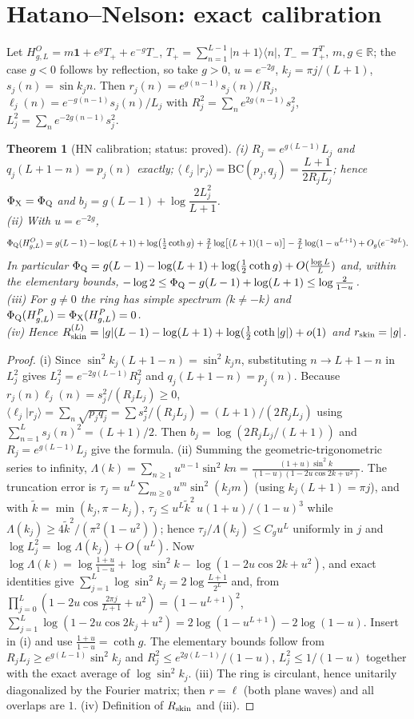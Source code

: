 \documentclass[11pt]{article}
\newtheorem{theorem}{Theorem}
\newcommand{\id}{\mathbf{1}}
\newcommand{\Rskin}{R_{\rm skin}}
\newcommand{\rskin}{r_{\rm skin}}
\newcommand{\PhiQ}{\Phi_{\rm Q}}
\newcommand{\PhiX}{\Phi_{\rm X}}
\newcommand{\BC}{\mathrm{BC}}
\newcommand{\ip}[2]{\langle #1|#2\rangle}
\begin{document}
\section{Hatano--Nelson: exact calibration}
Let $H^O_{g,L}=m\id+e^{g}T_++e^{-g}T_-$, $T_+=\sum_{n=1}^{L-1}|n{+}1\rangle\langle n|$, $T_-=T_+^T$, $m,g\in\mathbb R$; the case $g<0$ follows by reflection, so take $g>0$, $u=e^{-2g}$, $k_j=\pi j/(L+1)$, $s_j(n)=\sin k_jn$. Then $r_j(n)=e^{g(n-1)}s_j(n)/R_j$, $\ell_j(n)=e^{-g(n-1)}s_j(n)/L_j$ with $R_j^2=\sum_ne^{2g(n-1)}s_j^2$, $L_j^2=\sum_ne^{-2g(n-1)}s_j^2$.

\begin{theorem}[HN calibration; status: proved]\label{thm:HN}
(i) $R_j=e^{g(L-1)}L_j$ and $q_j(L+1-n)=p_j(n)$ exactly; $\ip{\ell_j}{r_j}=\BC(p_j,q_j)=\dfrac{L+1}{2R_jL_j}$; hence $\PhiX=\PhiQ$ and
$b_j=g(L-1)+\log\dfrac{2L_j^2}{L+1}$.\\
(ii) With $u=e^{-2g}$,
\[
\PhiQ(H^O_{g,L})=g(L-1)-\log(L+1)+\log\!\big(\tfrac12\coth g\big)+\tfrac2L\log\!\big[(L+1)(1-u)\big]-\tfrac2L\log(1-u^{L+1})+O_g(e^{-2gL}).
\]
In particular $\PhiQ=g(L-1)-\log(L+1)+\log(\tfrac12\coth g)+O(\tfrac{\log L}L)$ and, within the elementary bounds, $-\log2\le\PhiQ-g(L-1)+\log(L+1)\le\log\frac2{1-u}$.\\
(iii) For $g\neq0$ the ring has simple spectrum ($k\neq-k$) and $\PhiQ(H^P_{g,L})=\PhiX(H^P_{g,L})=0$.\\
(iv) Hence $\Rskin^{(L)}=|g|(L-1)-\log(L+1)+\log(\tfrac12\coth|g|)+o(1)$ and $\rskin=|g|$.
\end{theorem}
\begin{proof}
(i) Since $\sin^2k_j(L+1-n)=\sin^2k_jn$, substituting $n\to L+1-n$ in $L_j^2$ gives $L_j^2=e^{-2g(L-1)}R_j^2$ and $q_j(L+1-n)=p_j(n)$. Because $r_j(n)\ell_j(n)=s_j^2/(R_jL_j)\ge0$, $\ip{\ell_j}{r_j}=\sum_n\sqrt{p_jq_j}=\sum s_j^2/(R_jL_j)=(L+1)/(2R_jL_j)$ using $\sum_{n=1}^Ls_j(n)^2=(L+1)/2$. Then $b_j=\log(2R_jL_j/(L+1))$ and $R_j=e^{g(L-1)}L_j$ give the formula.
(ii) Summing the geometric-trigonometric series to infinity,
$\Lambda(k)=\sum_{n\ge1}u^{n-1}\sin^2kn=\frac{(1+u)\sin^2k}{(1-u)(1-2u\cos2k+u^2)}$.
The truncation error is $\tau_j=u^L\sum_{m\ge0}u^m\sin^2(k_jm)$ (using $k_j(L+1)=\pi j$), and with $\tilde k=\min(k_j,\pi-k_j)$, $\tau_j\le u^L\tilde k^2\,u(1+u)/(1-u)^3$ while $\Lambda(k_j)\ge4\tilde k^2/(\pi^2(1-u^2))$; hence $\tau_j/\Lambda(k_j)\le C_gu^L$ uniformly in $j$ and $\log L_j^2=\log\Lambda(k_j)+O(u^L)$. Now
$\log\Lambda(k)=\log\frac{1+u}{1-u}+\log\sin^2k-\log(1-2u\cos2k+u^2)$, and exact identities give
$\sum_{j=1}^L\log\sin^2k_j=2\log\frac{L+1}{2^L}$ and, from $\prod_{j=0}^{L}(1-2u\cos\frac{2\pi j}{L+1}+u^2)=(1-u^{L+1})^2$, $\sum_{j=1}^L\log(1-2u\cos2k_j+u^2)=2\log(1-u^{L+1})-2\log(1-u)$. Insert in (i) and use $\frac{1+u}{1-u}=\coth g$. The elementary bounds follow from $R_jL_j\ge e^{g(L-1)}\sin^2k_j$ and $R_j^2\le e^{2g(L-1)}/(1-u)$, $L_j^2\le1/(1-u)$ together with the exact average of $\log\sin^2k_j$.
(iii) The ring is circulant, hence unitarily diagonalized by the Fourier matrix; then $r=\ell$ (both plane waves) and all overlaps are $1$.
(iv) Definition of $\Rskin$ and (iii).
\end{proof}
\end{document}
